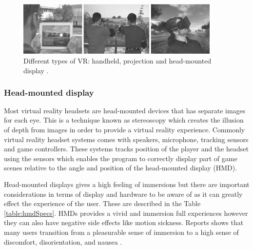 \begin{figure}[!ht]
    \centering
    \includegraphics[width=0.9\textwidth]{./fig/background/vrDisplays.PNG}
    \caption{Different types of VR: handheld, projection and head-mounted display \cite{alexander2017virtual}.}
    \label{fig:vrDiplays}
\end{figure}



\subsubsection{Head-mounted display}
Most virtual reality headsets are head-mounted devices that has separate images for each eye. This is a technique known as stereoscopy which creates the illusion of depth from images in order to provide a virtual reality experience. Commonly virtual reality headset systems comes with speakers, microphone, tracking sensors and game controllers. These systems tracks position of the player and the headset using the sensors which enables the program to correctly display part of game scenes relative to the angle and position of the head-mounted display (HMD).

Head-mounted displays gives a high feeling of immersions but there are important considerations in terms of display and hardware to be aware of as it can greatly effect the experience of the user. These are described in the Table \ref{table:hmdSpecs}. HMDs provides a vivid and immersion full experiences however they can also have negative side effects like motion sickness. Reports shows that many users transition from a pleasurable sense of immersion to a high sense of discomfort, disorientation, and nausea \cite{munafo2017virtual}. 

